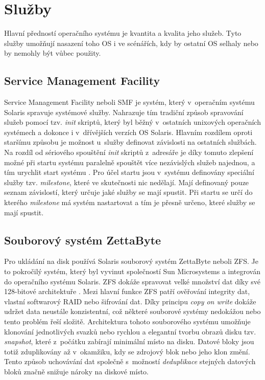 \section{Služby}
\label{chapter:solaris:services}
Hlavní předností operačního systému je kvantita a kvalita jeho služeb. Tyto služby umožňují nasazení toho OS i ve scénářích,
kdy by ostatní OS selhaly nebo by nemohly být vůbec použity.  
\subsection{Service Management Facility}
\label{chapter:solaris:smf}
Service Management Facility neboli SMF je systém, který v~operačním systému Solaris spravuje systémové služby. Nahrazuje tím
tradiční způsob spravování služeb pomocí tzv. \textit{init} skriptů, který byl běžný v~ostatních unixových operačních systémech
a dokonce i v~dřívějších verzích OS Solaris. Hlavním rozdílem oproti staršímu způsobu je možnost u~služby definovat závislosti
na ostatních službách. Na rozdíl od sériového spouštění \textit{init} skriptů z~adresáře je díky tomuto zlepšení možné při startu
systému paralelně spouštět více nezávislých služeb najednou, a tím urychlit start systému \cite{cvut:biadu:sysstart}. Pro účel
startu jsou v~systému definovány speciální služby tzv. \textit{milestone}, které ve skutečnosti nic nedělají. Mají definovaný
pouze seznam závislostí, který určuje jaké služby se mají spustit. Při startu se určí do kterého \textit{milestone} má systém
nastartovat a tím je přesně určeno, které služby se mají spustit.
\subsection{Souborový systém ZettaByte}
\label{chapter:solaris:zfs}
Pro ukládání na disk používá Solaris souborový systém ZettaByte neboli ZFS. Je to pokročilý systém, který byl vyvinut společností
Sun Microsystems a integrován do operačního systému Solaris. ZFS dokáže spravovat velké množství dat díky své 128-bitové 
architektuře \cite{cvut:thesis:mythesis}. Mezi hlavní funkce ZFS patří ověřování integrity dat, vlastní softwarový RAID nebo
šifrování dat. Díky principu \textit{copy on write} dokáže udržet data neustále konzistentní, což některé souborové systémy
nedokážou nebo tento problém řeší složitě. Architektura tohoto souborového systému umožňuje klonování jednotlivých svazků nebo
rychlou a elegantní tvorbu obrazů disku tzv. \textit{snapshot}, které z~počátku zabírají minimální místo na disku. Datové bloky
jsou totiž zduplikovány až v~okamžiku, kdy se zdrojový blok nebo jeho klon změní. Tento způsob uchovávání dat společně s~možností
\textit{deduplikace} stejných datových bloků značně snižuje nároky na diskové místo.

